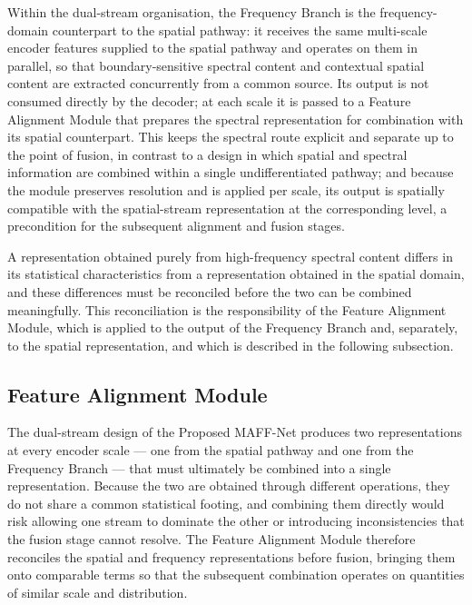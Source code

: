 Within the dual-stream organisation, the Frequency Branch is the frequency-domain counterpart to the spatial pathway: it receives the same multi-scale encoder features supplied to the spatial pathway and operates on them in parallel, so that boundary-sensitive spectral content and contextual spatial content are extracted concurrently from a common source. Its output is not consumed directly by the decoder; at each scale it is passed to a Feature Alignment Module that prepares the spectral representation for combination with its spatial counterpart. This keeps the spectral route explicit and separate up to the point of fusion, in contrast to a design in which spatial and spectral information are combined within a single undifferentiated pathway; and because the module preserves resolution and is applied per scale, its output is spatially compatible with the spatial-stream representation at the corresponding level, a precondition for the subsequent alignment and fusion stages.

A representation obtained purely from high-frequency spectral content differs in its statistical characteristics from a representation obtained in the spatial domain, and these differences must be reconciled before the two can be combined meaningfully. This reconciliation is the responsibility of the Feature Alignment Module, which is applied to the output of the Frequency Branch and, separately, to the spatial representation, and which is described in the following subsection.

\subsection{Feature Alignment Module}

The dual-stream design of the Proposed MAFF-Net produces two representations at every encoder scale --- one from the spatial pathway and one from the Frequency Branch --- that must ultimately be combined into a single representation. Because the two are obtained through different operations, they do not share a common statistical footing, and combining them directly would risk allowing one stream to dominate the other or introducing inconsistencies that the fusion stage cannot resolve. The Feature Alignment Module therefore reconciles the spatial and frequency representations before fusion, bringing them onto comparable terms so that the subsequent combination operates on quantities of similar scale and distribution.

